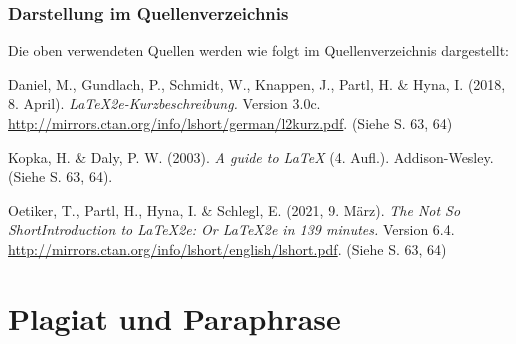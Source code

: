 \subsubsection{Darstellung im Quellenverzeichnis}

\begin{sloppypar}
Die oben verwendeten Quellen werden wie folgt im Quellenverzeichnis dargestellt:
%
\begin{list}{}{
\setlength{\leftmargin}{1.3cm}
\setlength{\itemindent}{-1.3cm}
\setlength{\itemsep}{-0.15cm}
}
\item
Daniel, M., Gundlach, P., Schmidt, W., Knappen, J., Partl, H. \& Hyna, I. (2018, 8. April).
\textit{\LaTeX2e-Kurzbeschreibung.} Version 3.0c.
\textrm{\url{http://mirrors.ctan.org/info/lshort/german/l2kurz.pdf}}.
(Siehe S. 63, 64)
\item
Kopka, H. \& Daly, P. W. (2003). \textit{A guide to \LaTeX} (4. Aufl.).
Addison-Wesley. (Siehe S. 63, 64).
\item
Oetiker, T., Partl, H., Hyna, I. \& Schlegl, E. (2021, 9. März). \textit{The Not So ShortIntroduction to \LaTeX2e: Or
\LaTeX2e in 139 minutes.} Version 6.4. \url{http://mirrors.ctan.org/info/lshort/english/lshort.pdf}. (Siehe S. 63, 64)
\end{list}
\end{sloppypar}




\section{Plagiat und Paraphrase}
\label{sec:Plagiarismus}

